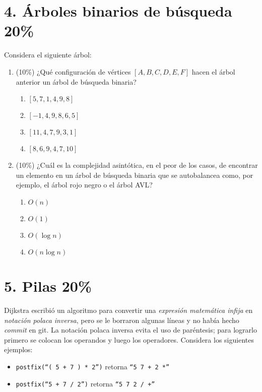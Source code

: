 \documentclass[10 pt]{article}
\begin{document}
\begin{multicols}{2}
\section{4. Árboles binarios de búsqueda 20\%}
Considera el siguiente árbol:
\begin{center}
\end{center}
\begin{enumerate}[label=\alph*]
	\item (10\%) ¿Qué configuración de vértices $[A, B, C, D, E, F]$ hacen el árbol anterior un árbol de búsqueda binaria?
	\begin{enumerate}[label=\roman*]
		\item $[5, 7, 1, 4, 9, 8]$
		\item $[-1, 4, 9, 8, 6, 5]$
		\item $[11, 4, 7, 9, 3, 1]$
		\item $[8, 6, 9, 4, 7, 10]$
	\end{enumerate}
	\item (10\%) ¿Cuál es la complejidad asintótica, en el peor de los casos, de encontrar un elemento en un árbol de búsqueda binaria que se autobalancea como, por ejemplo, el árbol rojo negro o el árbol AVL?
	\begin{enumerate}[label=\roman*]
		\item $O(n)$
		\item $O(1)$
		\item $O(\log n)$
		\item $O(n \log n)$
	\end{enumerate}
	
\end{enumerate}

\section{5. Pilas 20\%}
Dijkstra escribió un algoritmo para convertir una \emph{expresión matemática infija} en 
\emph{notación polaca inversa}, pero se le borraron algunas líneas y no había hecho \emph{commit} en git. La notación polaca inversa evita el uso de
paréntesis; para lograrlo primero se colocan los operandos y luego 
los operadores. Considera los siguientes ejemplos:
{\small
\begin{itemize}
  \item \texttt{postfix(``( 5 + 7 ) * 2'')} retorna \texttt{``5 7 + 2 *''}
  \item \texttt{postfix(``5 + 7 / 2'')} retorna \texttt{``5 7 2 / +''}
\end{itemize}
}




\end{multicols}
\end{document}
